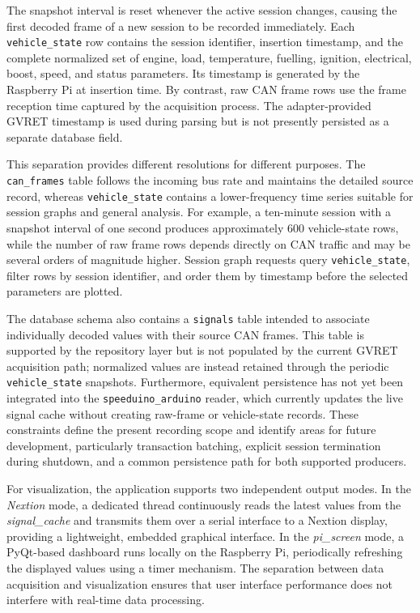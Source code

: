 The snapshot interval is reset whenever the active session changes, causing the first decoded frame of a new session to be recorded immediately. Each \texttt{vehicle\_state} row contains the session identifier, insertion timestamp, and the complete normalized set of engine, load, temperature, fuelling, ignition, electrical, boost, speed, and status parameters. Its timestamp is generated by the Raspberry Pi at insertion time. By contrast, raw CAN frame rows use the frame reception time captured by the acquisition process. The adapter-provided GVRET timestamp is used during parsing but is not presently persisted as a separate database field.

This separation provides different resolutions for different purposes. The \texttt{can\_frames} table follows the incoming bus rate and maintains the detailed source record, whereas \texttt{vehicle\_state} contains a lower-frequency time series suitable for session graphs and general analysis. For example, a ten-minute session with a snapshot interval of one second produces approximately 600 vehicle-state rows, while the number of raw frame rows depends directly on CAN traffic and may be several orders of magnitude higher. Session graph requests query \texttt{vehicle\_state}, filter rows by session identifier, and order them by timestamp before the selected parameters are plotted.

The database schema also contains a \texttt{signals} table intended to associate individually decoded values with their source CAN frames. This table is supported by the repository layer but is not populated by the current GVRET acquisition path; normalized values are instead retained through the periodic \texttt{vehicle\_state} snapshots. Furthermore, equivalent persistence has not yet been integrated into the \texttt{speeduino\_arduino} reader, which currently updates the live signal cache without creating raw-frame or vehicle-state records. These constraints define the present recording scope and identify areas for future development, particularly transaction batching, explicit session termination during shutdown, and a common persistence path for both supported producers.

For visualization, the application supports two independent output modes. In the \textit{Nextion} mode, a dedicated thread continuously reads the latest values from the \textit{signal\_cache} and transmits them over a serial interface to a Nextion display, providing a lightweight, embedded graphical interface. In the \textit{pi\_screen} mode, a PyQt-based dashboard runs locally on the Raspberry Pi, periodically refreshing the displayed values using a timer mechanism. The separation between data acquisition and visualization ensures that user interface performance does not interfere with real-time data processing.

